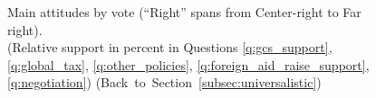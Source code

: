 \begin{figure}[h!] 
    \caption[Main attitudes by vote]{Main attitudes by vote (``Right'' spans from Center-right to Far right). \\ (Relative support in percent in Questions \ref{q:gcs_support}, \ref{q:global_tax}, \ref{q:other_policies}, \ref{q:foreign_aid_raise_support}, \ref{q:negotiation}) \hfill (Back~to~Section~\ref{subsec:universalistic})}\label{fig:main_by_vote}
\end{figure}





